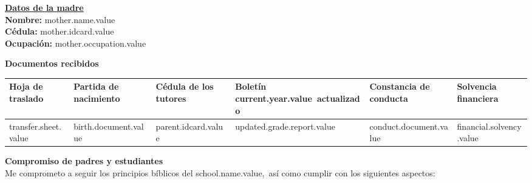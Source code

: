 \documentclass[12pt]{article}
\newcommand{\schoolName}{school.name.value}
\newcommand{\aField}[1]{#1}
\newcommand{\motherName}{mother.name.value}
\newcommand{\motherIdcard}{mother.idcard.value}
\newcommand{\motherOccupation}{mother.occupation.value}
\newcommand{\transferSheet}{transfer.sheet.value}
\newcommand{\currentYear}{current.year.value}
\newcommand{\birthDocument}{birth.document.value}
\newcommand{\parentIdcard}{parent.idcard.value}
\newcommand{\updatedGradeReport}{updated.grade.report.value}
\newcommand{\conductDocument}{conduct.document.value}
\newcommand{\financialSolvency}{financial.solvency.value}
\begin{document}
    \hfill
    \begin{minipage}[t]{0.49\textwidth}
        \textbf{\uline{Datos de la madre}}\\[1mm]
        \textbf{Nombre:} \aField{\motherName}\\
        \textbf{Cédula:} \aField{\motherIdcard}\\
        \textbf{Ocupación:} \aField{\motherOccupation}
    \end{minipage}
    \par\vspace{7mm}
    \textbf{Documentos recibidos}
    \begin{table}[H]
        \centering
        \begin{tabular}{|p{1.8cm}|p{2.3cm}|p{2.2cm}|p{2.5cm}|p{2.5cm}|p{2cm}|}
            \hline
            Hoja de traslado &
            Partida de nacimiento &
            Cédula de los tutores &
            Boletín \currentYear\ actualizado &
            Constancia de conducta &
            Solvencia financiera\\
            \hline
            \hspace{6mm}\transferSheet &
            \hspace{9mm}\birthDocument &
            \hspace{9mm}\parentIdcard &
            \hspace{10mm}\updatedGradeReport &
            \hspace{10mm}\conductDocument &
            \hspace{7mm}\financialSolvency\\
            \hline
        \end{tabular}
    \end{table}
    \textbf{Compromiso de padres y estudiantes}\\
    Me comprometo a seguir los principios bíblicos del \schoolName,\ así como cumplir con los siguientes aspectos:
\end{document}
